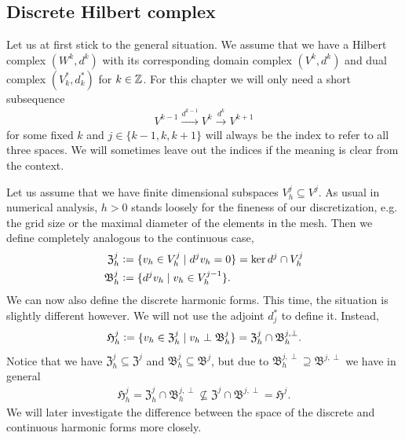 \documentclass[../master_thesis.tex]{subfiles}
\begin{document}
\subsection{Discrete Hilbert complex}\label{sec:discrete_hilbert_complex}

Let us at first stick to the general situation. We assume that we have a Hilbert complex 
$(W^k,d^k)$ with its corresponding domain complex 
$(V^k,d^k)$ and dual complex $(V^*_k,d^*_k)$ for $k \in \mathbb{Z}$. For this chapter 
we will only need a short subsequence 
\begin{align*}
    V^{k-1} \xrightarrow{d^{k-1}} V^k \xrightarrow{d^{k}} V^{k+1}
\end{align*}
for some fixed $k$ and $j \in \{k-1,k,k+1\}$ will always be the index to refer to 
all three spaces. We will sometimes leave out the indices if the meaning is clear from the context.

Let us assume that we have finite dimensional subspaces $V_h^j \subseteq V^j$. 
As usual in numerical analysis, $h>0$ stands loosely for the fineness of our discretization, 
e.g. the grid size or the maximal diameter of the elements in the mesh.
Then we define completely analogous to the continuous case,
\begin{align*}
    \mathfrak{Z}_h^j &\vcentcolon= \{ v_h \in V_h^j \mid d^j v_h = 0 \} = \ker d^j \cap V^j_h
    \\ \mathfrak{B}^j_h &\vcentcolon= \{ d^j v_h \mid v_h \in V_h^{j-1} \}.
\end{align*}
We can now also define the discrete harmonic forms. This time, the situation is slightly 
different however. We will not use the adjoint $d^*_j$ to define it.
Instead,
\begin{align*}
    \mathfrak{H}_h^j \vcentcolon= \{ v_h \in \mathfrak{Z}_h^j \mid v_h \perp \mathfrak{B}^j_h \}
        = \mathfrak{Z}_h^j \cap \mathfrak{B}_h^{j,\perp}.
\end{align*}
Notice that we have $\mathfrak{Z}_h^j \subseteq \mathfrak{Z}^j$ and 
$\mathfrak{B}_h^j \subseteq \mathfrak{B}^j$, but due to 
$\mathfrak{B}_h^{j,\perp} \supseteq \mathfrak{B}^{j,\perp}$ we have in general
\begin{align*}
    \mathfrak{H}^j_h = \mathfrak{Z}_h^j \cap \mathfrak{B}_h^{j,\perp} 
    \not\subseteq    \mathfrak{Z}^j \cap \mathfrak{B}^{j,\perp} = \mathfrak{H}^j.
\end{align*}
We will later investigate the difference between the space of the discrete and continuous 
harmonic forms more closely.
\end{document}
